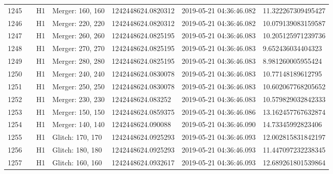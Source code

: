 \begin{longtable}{lllllll}
1245 &                                                    &       H1 &  Merger: 160, 160 &  1242448624.0820312 &  2019-05-21 04:36:46.082 &  11.322267309495427 \\
1246 &                                                    &       H1 &  Merger: 220, 220 &  1242448624.0820312 &  2019-05-21 04:36:46.082 &  10.079139083159587 \\
1247 &                                                    &       H1 &  Merger: 260, 260 &  1242448624.0825195 &  2019-05-21 04:36:46.083 &  10.205125971239736 \\
1248 &                                                    &       H1 &  Merger: 270, 270 &  1242448624.0825195 &  2019-05-21 04:36:46.083 &   9.652436034404323 \\
1249 &                                                    &       H1 &  Merger: 280, 280 &  1242448624.0825195 &  2019-05-21 04:36:46.083 &   8.981260005955424 \\
1250 &                                                    &       H1 &  Merger: 240, 240 &  1242448624.0830078 &  2019-05-21 04:36:46.083 &   10.77148189612795 \\
1251 &                                                    &       H1 &  Merger: 250, 250 &  1242448624.0830078 &  2019-05-21 04:36:46.083 &  10.602067768205652 \\
1252 &                                                    &       H1 &  Merger: 230, 230 &   1242448624.083252 &  2019-05-21 04:36:46.083 &  10.579829032842333 \\
1253 &                                                    &       H1 &  Merger: 150, 150 &  1242448624.0859375 &  2019-05-21 04:36:46.086 &  13.162457767632874 \\
1254 &                                                    &       H1 &  Merger: 140, 140 &   1242448624.090088 &  2019-05-21 04:36:46.090 &   14.73345992823406 \\
1255 &                                                    &       H1 &  Glitch: 170, 170 &  1242448624.0925293 &  2019-05-21 04:36:46.093 &  12.002815831842197 \\
1256 &                                                    &       H1 &  Glitch: 180, 180 &  1242448624.0925293 &  2019-05-21 04:36:46.093 &  11.447097232238345 \\
1257 &                                                    &       H1 &  Glitch: 160, 160 &  1242448624.0932617 &  2019-05-21 04:36:46.093 &  12.689261801539864 \\

\end{longtable}
